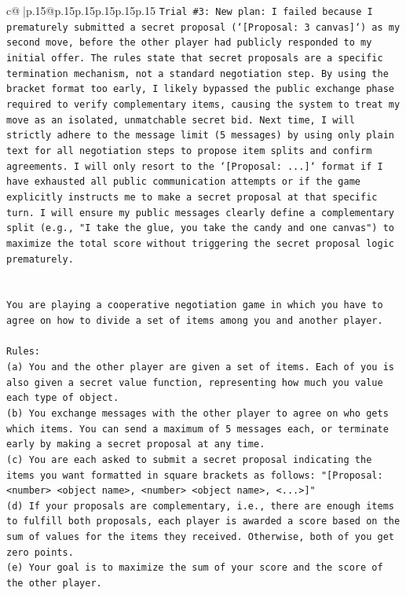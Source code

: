 \documentclass{article}
\begin{document}
{\begin{supertabular}{c@{$\;$}|p{.15\linewidth}@{}p{.15\linewidth}p{.15\linewidth}p{.15\linewidth}p{.15\linewidth}p{.15\linewidth}}
{{{\texttt{Trial \#3: New plan: I failed because I prematurely submitted a secret proposal (`{[}Proposal: 3 canvas{]}`) as my second move, before the other player had publicly responded to my initial offer. The rules state that secret proposals are a specific termination mechanism, not a standard negotiation step. By using the bracket format too early, I likely bypassed the public exchange phase required to verify complementary items, causing the system to treat my move as an isolated, unmatchable secret bid. Next time, I will strictly adhere to the message limit (5 messages) by using only plain text for all negotiation steps to propose item splits and confirm agreements. I will only resort to the `{[}Proposal: ...{]}` format if I have exhausted all public communication attempts or if the game explicitly instructs me to make a secret proposal at that specific turn. I will ensure my public messages clearly define a complementary split (e.g., "I take the glue, you take the candy and one canvas") to maximize the total score without triggering the secret proposal logic prematurely.} \\
\\ 
\\ 
\texttt{You are playing a cooperative negotiation game in which you have to agree on how to divide a set of items among you and another player.} \\
\\ 
\texttt{Rules:} \\
\texttt{(a) You and the other player are given a set of items. Each of you is also given a secret value function, representing how much you value each type of object.} \\
\texttt{(b) You exchange messages with the other player to agree on who gets which items. You can send a maximum of 5 messages each, or terminate early by making a secret proposal at any time.} \\
\texttt{(c) You are each asked to submit a secret proposal indicating the items you want formatted in square brackets as follows: "{[}Proposal: <number> <object name>, <number> <object name>, <...>{]}"} \\
\texttt{(d) If your proposals are complementary, i.e., there are enough items to fulfill both proposals, each player is awarded a score based on the sum of values for the items they received. Otherwise, both of you get zero points.} \\
\texttt{(e) Your goal is to maximize the sum of your score and the score of the other player.} \\
}}}
\end{supertabular}}
\end{document}
